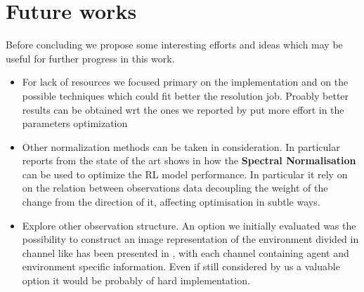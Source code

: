 \section{Future works}
Before concluding we propose some interesting efforts and ideas which may be useful for further progress in this work.
\begin{itemize}
    \item For lack of resources we focused primary on the implementation and on the possible techniques which could fit better the resolution job. Proably better results can be obtained wrt the ones we reported by put more effort in the parameters optimization  
	\item Other normalization methods can be taken in consideration. In particular reports from the state of the art shows in \cite{spectralNorm} how the \textbf{Spectral Normalisation} can be used to optimize the RL model performance. In particular it rely on on the relation between observations data decoupling the weight of the change from the direction of it, affecting optimisation in subtle ways.
	\item Explore other observation structure. An option we initially evaluated was the possibility to construct an image representation of the environment divided in channel like has been presented in \cite{graphObserv},  with each channel containing agent and environment specific information. Even if still considered by us a valuable option it would be probably of hard implementation.
\end{itemize}
